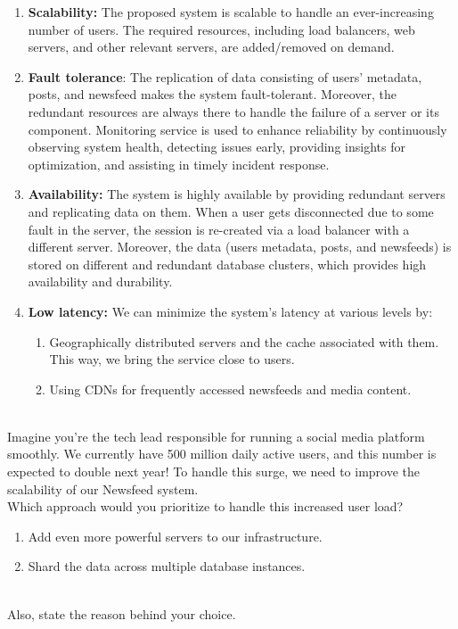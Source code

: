 \begin{enumerate}
\item
\protect{}\label{uRi0jGAoeQIK7LYFf4sjs}
\textbf{Scalability:} The proposed system is scalable to handle an ever-increasing number of users. The required resources, including load balancers, web servers, and other relevant servers, are added/removed on demand.
\item
\protect{}\label{CjfL70lJy2-nv22_H6Iw-}
\textbf{Fault tolerance}: The replication of data consisting of users' metadata, posts, and newsfeed makes the system fault-tolerant. Moreover, the redundant resources are always there to handle the failure of a server or its component. Monitoring service is used to enhance reliability by continuously observing system health, detecting issues early, providing insights for optimization, and assisting in timely incident response.
\item
\protect{}\label{0aXHmg9EAtg80KCglC4FG}
\textbf{Availability:} The system is highly available by providing redundant servers and replicating data on them. When a user gets disconnected due to some fault in the server, the session is re-created via a load balancer with a different server. Moreover, the data (users\textquotesingle{} metadata, posts, and newsfeeds) is stored on different and redundant database clusters, which provides high availability and durability.
\item
\protect{}\label{DoUMMj3kAp3gN9wm6xv9d}
\textbf{Low latency:} We can minimize the system's latency at various levels by:

\begin{enumerate}
\item
Geographically distributed servers and the cache associated with them. This way, we bring the service close to users.
\item
Using CDNs for frequently accessed newsfeeds and media content.
\end{enumerate}
\end{enumerate}
\\
Imagine you're the tech lead responsible for running a social media platform smoothly. We currently have 500 million daily active users, and this number is expected to double next year! To handle this surge, we need to improve the scalability of our Newsfeed system.
\\
Which approach would you prioritize to handle this increased user load?

\begin{enumerate}
\item
Add even more powerful servers to our infrastructure.
\item
Shard the data across multiple database instances.
\end{enumerate}
\\
Also, state the reason behind your choice.

